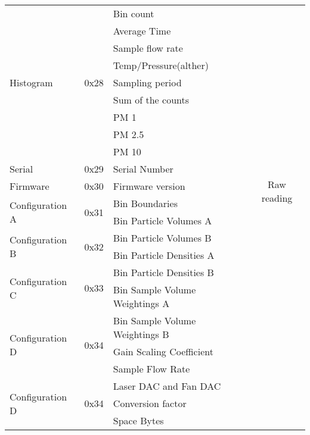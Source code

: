\begin{center}
\begin{longtable}{|l|c|>{\centering}p{}|c|}
     \rowcolor{black!8} \multicolumn{4}{|c|}{{Alpha Sensor}} \\ \hline
        \multirow{9}{*}{Histogram} & \multirow{9}{*}{0x28} & Bin count & \multirow{20}{*}{Raw reading} \\ \cline{3-3}
        & & Average Time &\\ \cline{3-3}
        & & Sample flow rate &\\ \cline{3-3}
        & & Temp/Pressure(alther) &\\ \cline{3-3}
        & & Sampling period &\\ \cline{3-3}
        & & Sum of the counts &\\ \cline{3-3}
        & & PM 1 &\\ \cline{3-3}
        & & PM 2.5 &\\ \cline{3-3}
        & & PM 10 &\\ \cline{1-3}
        Serial & 0x29 & Serial Number & \\ \cline{1-3}
        Firmware & 0x30 & Firmware version & \\ \cline{1-3}
        \multirow{2}{*}{Configuration A} & \multirow{2}{*}{0x31} & Bin Boundaries &\\ \cline{3-3}
        & & Bin Particle Volumes A &\\ \cline{1-3}
        \multirow{2}{*}{Configuration B} & \multirow{2}{*}{0x32} & Bin Particle Volumes B &\\ \cline{3-3}
        & & Bin Particle Densities A &\\ \cline{1-3}
        \multirow{2}{*}{Configuration C} & \multirow{2}{*}{0x33} & Bin Particle Densities B &\\ \cline{3-3}
        & & Bin Sample Volume Weightings A &\\ \cline{1-3}
        \multirow{3}{*}{Configuration D} & \multirow{3}{*}{0x34} & Bin Sample Volume Weightings B &\\ \cline{3-3}
        & & Gain Scaling Coefficient & \\ \cline{3-3}
        & & Sample Flow Rate & \\
        \multirow{3}{*}{Configuration D} & \multirow{3}{*}{0x34} & Laser DAC and Fan DAC & \\ \cline{3-3}
        & & Conversion factor & \\ \cline{3-3}
        & & Space Bytes & \\ 

\end{longtable}
\end{center}


